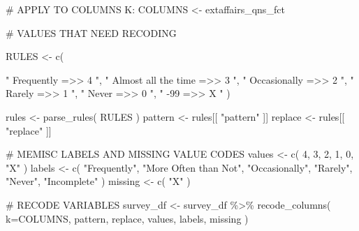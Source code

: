 \documentclass[
  letterpaper,
]{scrbook}
\newenvironment{Shaded}{\begin{snugshade}}{\end{snugshade}}
\newcommand{\AttributeTok}[1]{\textcolor[rgb]{0.40,0.45,0.13}{#1}}
\newcommand{\CommentTok}[1]{\textcolor[rgb]{0.37,0.37,0.37}{#1}}
\newcommand{\DecValTok}[1]{\textcolor[rgb]{0.68,0.00,0.00}{#1}}
\newcommand{\FunctionTok}[1]{\textcolor[rgb]{0.28,0.35,0.67}{#1}}
\newcommand{\NormalTok}[1]{\textcolor[rgb]{0.00,0.23,0.31}{#1}}
\newcommand{\OtherTok}[1]{\textcolor[rgb]{0.00,0.23,0.31}{#1}}
\newcommand{\SpecialCharTok}[1]{\textcolor[rgb]{0.37,0.37,0.37}{#1}}
\newcommand{\StringTok}[1]{\textcolor[rgb]{0.13,0.47,0.30}{#1}}
\begin{document}
\begin{Shaded}
\begin{Highlighting}[]
\CommentTok{\# APPLY TO COLUMNS K:}
\NormalTok{COLUMNS }\OtherTok{\textless{}{-}}\NormalTok{  extaffairs\_qns\_fct}

\CommentTok{\# VALUES THAT NEED RECODING}

\NormalTok{RULES }\OtherTok{\textless{}{-}} \FunctionTok{c}\NormalTok{(    }

     \StringTok{"             Frequently    =\textgreater{}\textgreater{}     4   "}\NormalTok{,}
     \StringTok{"    Almost all the time    =\textgreater{}\textgreater{}     3   "}\NormalTok{,}
     \StringTok{"           Occasionally    =\textgreater{}\textgreater{}     2   "}\NormalTok{,}
     \StringTok{"                 Rarely    =\textgreater{}\textgreater{}     1   "}\NormalTok{,}
     \StringTok{"                  Never    =\textgreater{}\textgreater{}     0   "}\NormalTok{,}
     \StringTok{"                    {-}99    =\textgreater{}\textgreater{}     X   "}\NormalTok{   )}
     
\NormalTok{rules }\OtherTok{\textless{}{-}} \FunctionTok{parse\_rules}\NormalTok{( RULES )          }
\NormalTok{pattern }\OtherTok{\textless{}{-}}\NormalTok{ rules[[ }\StringTok{"pattern"}\NormalTok{ ]]}
\NormalTok{replace }\OtherTok{\textless{}{-}}\NormalTok{ rules[[ }\StringTok{"replace"}\NormalTok{ ]]}

\CommentTok{\# MEMISC LABELS AND MISSING VALUE CODES }
\NormalTok{values  }\OtherTok{\textless{}{-}} \FunctionTok{c}\NormalTok{( }\DecValTok{4}\NormalTok{, }\DecValTok{3}\NormalTok{, }\DecValTok{2}\NormalTok{, }\DecValTok{1}\NormalTok{, }\DecValTok{0}\NormalTok{, }\StringTok{"X"}\NormalTok{ )}
\NormalTok{labels  }\OtherTok{\textless{}{-}} \FunctionTok{c}\NormalTok{( }\StringTok{"Frequently"}\NormalTok{, }\StringTok{"More Often than Not"}\NormalTok{, }
              \StringTok{"Occasionally"}\NormalTok{, }\StringTok{"Rarely"}\NormalTok{, }\StringTok{"Never"}\NormalTok{, }\StringTok{"Incomplete"}\NormalTok{ )}
\NormalTok{missing }\OtherTok{\textless{}{-}} \FunctionTok{c}\NormalTok{( }\StringTok{"X"}\NormalTok{ )}

\CommentTok{\# RECODE VARIABLES }
\NormalTok{survey\_df }\OtherTok{\textless{}{-}} 
\NormalTok{  survey\_df }\SpecialCharTok{\%\textgreater{}\%} 
  \FunctionTok{recode\_columns}\NormalTok{( }\AttributeTok{k=}\NormalTok{COLUMNS, pattern, replace, values, labels, missing )}
\end{Highlighting}
\end{Shaded}
\end{document}
